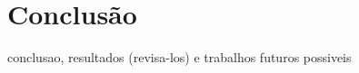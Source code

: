 \chapter{Conclusão} \label{cap:c}

conclusao,
resultados (revisa-los)
e trabalhos futuros possiveis

